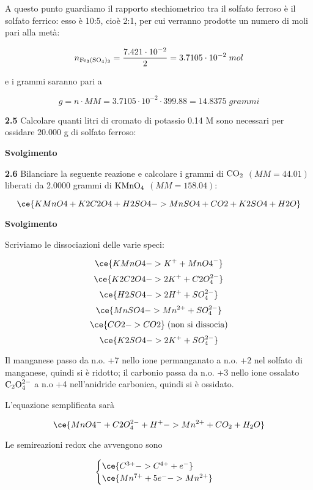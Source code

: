 A questo punto guardiamo il rapporto stechiometrico tra il solfato ferroso è il solfato ferrico: esso è 10:5, cioè 2:1, per cui verranno prodotte un numero di moli pari alla metà:

$$n_{\rm Fe_3(SO_4)_3}=\frac{7.421 \cdot 10^{-2}}{2}=3.7105 \cdot 10^{-2}\;mol$$

e i grammi saranno pari a 

$$g=n \cdot MM=3.7105 \cdot 10^{-2} \cdot 399.88=14.8375\;grammi$$

\vspace{0.2cm}\textbf{2.5} Calcolare quanti litri di cromato di potassio 0.14 M sono necessari per ossidare 20.000 g di solfato ferroso:
\begin{center}

\end{center}

\large\textbf{Svolgimento}\normalsize

\vspace{0.2cm}

\vspace{0.2cm}\textbf{2.6}  Bilanciare la seguente reazione e calcolare i grammi di $\rm CO_2$ $(MM=44.01)$ liberati da 2.0000 grammi di $\rm KMnO_4$ $(MM=158.04)$:


$$\ce{KMnO4 + K2C2O4 + H2SO4 -> MnSO4 + CO2 + K2SO4 + H2O}$$

\vspace{0.2cm}\large\textbf{Svolgimento}\normalsize

\vspace{0.2cm}Scriviamo le dissociazioni delle varie speci:

$$\ce{KMnO4 -> K^+ + MnO4^-}$$
$$\ce{K2C2O4 -> 2K^+ + C2O_4^{2-}}$$
$$\ce{H2SO4 -> 2H^+ + SO_4^{2-}}$$
$$\ce{MnSO4 -> Mn^{2+} + SO_4^{2-}}$$
$$\ce{CO2 -> CO2}\;\text{(non si dissocia)}$$
$$\ce{K2SO4 -> 2K^+ + SO_4^{2-}}$$

Il manganese passo da n.o. +7 nello ione permanganato a n.o. +2 nel solfato di manganese, quindi si è ridotto; il carbonio passa da n.o. +3 nello ione ossalato $\rm C_2O_4^{2-}$ a n.o +4 nell'anidride carbonica, quindi si è ossidato.

L'equazione semplificata sarà

$$\ce{MnO4^- + C2O_4^{2-} + H^+ -> Mn^{2+} + CO_2 + H_2O}$$

Le semireazioni redox che avvengono sono

$$\begin{cases}
    \ce{C^{3+} -> C^{4+} + e^-}\\
    \ce{Mn^{7+} + 5e^- -> Mn^{2+}}
\end{cases}$$

